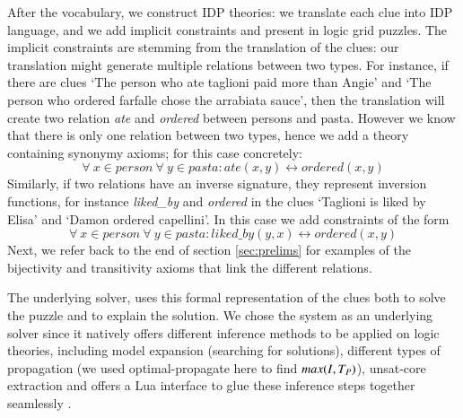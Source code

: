 After the vocabulary, we construct IDP theories: we translate each clue into IDP language, and  we add implicit constraints and present in logic grid puzzles.
The implicit constraints are stemming from the translation of the clues: our translation might generate multiple relations between two types. 
For instance, if there are clues `The person who ate taglioni paid more than Angie' and `The person who ordered farfalle chose the arrabiata sauce', then the translation will create two relation \textit{ate} and \textit{ordered} between persons and pasta.
However we know that there is only one relation between two types, hence we add a theory containing synonymy axioms; for this case concretely:
\[ \forall \ x \in person \ \forall \ y \in pasta : ate(x, y) \leftrightarrow ordered(x, y) \]
Similarly, if two relations have an inverse signature, they represent inversion functions, for instance \textit{liked\_by} and \textit{ordered} in the clues `Taglioni is liked by Elisa' and `Damon ordered capellini'. 
In this case we add constraints of the form 
\[ \forall \ x \in person \ \forall \ y \in pasta : liked\_by(y, x) \leftrightarrow ordered(x, y)\]
Next, we refer back to the end of section \ref{sec:prelims} for examples of the bijectivity and transitivity axioms that link the different relations.

The underlying solver, \idp\cite{IDP} uses this formal representation of the clues both to solve the puzzle and to explain the solution. 
We chose the \idp system as an underlying solver since it natively offers different inference methods to be applied on logic theories, including model expansion (searching for solutions), different types of propagation (we used optimal-propagate here to find $max(I,T_P)$), unsat-core extraction and offers a Lua \cite{ierusalimschy1996lua} interface to glue these inference steps together seamlessly \cite{IDP}.


